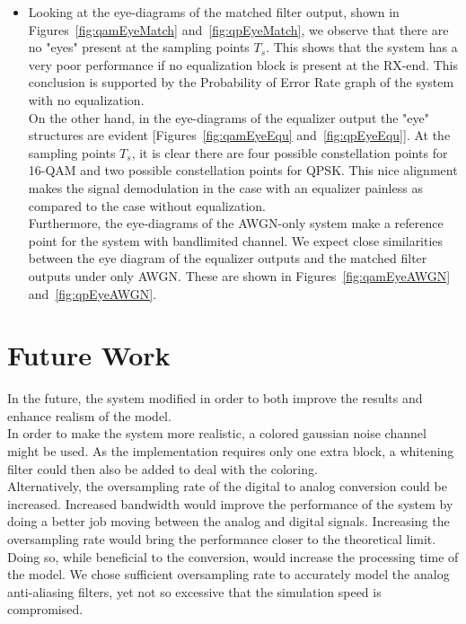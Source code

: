 \documentclass[]{article}
\begin{document}
\begin{itemize}
\item Looking at the eye-diagrams of the matched filter output, shown in Figures~\ref{fig:qamEyeMatch} and~\ref{fig:qpEyeMatch}, we observe that there are no "eyes" present at the sampling points $T_s$. This shows that the system has a very poor performance if no equalization block is present at the RX-end. This conclusion is supported by the Probability of Error Rate graph of the system with no equalization. \\

On the other hand, in the eye-diagrams of the equalizer output the "eye" structures are evident [Figures~\ref{fig:qamEyeEqu} and~\ref{fig:qpEyeEqu}].  At the sampling points $T_s$, it is clear there are four possible constellation points for 16-QAM and two possible constellation points for QPSK.  This nice alignment makes the signal demodulation in the case with an equalizer painless as compared to the case without equalization.  \\

Furthermore, the eye-diagrams of the AWGN-only system make a reference point for the system with bandlimited channel.  We expect close similarities between the eye diagram of the equalizer outputs and the matched filter outputs under only AWGN.  These are shown in Figures~\ref{fig:qamEyeAWGN} and~\ref{fig:qpEyeAWGN}. 
\end{itemize}



\section{Future Work}
\label{sec:future}
In the future, the system modified in order to both improve the results and enhance realism of the model. \\

In order to make the system more realistic, a colored gaussian noise channel might be used. As the implementation requires only one extra block, a whitening filter could then also be added to deal with the coloring. \\

Alternatively, the oversampling rate of the digital to analog conversion could be increased.  Increased bandwidth would improve the performance of the system by doing a better job moving between the analog and digital signals.   Increasing the oversampling rate would bring the performance closer to the theoretical limit.  Doing so, while beneficial to the conversion, would increase the processing time of the model.  We chose sufficient oversampling rate to accurately model the analog anti-aliasing filters, yet not so excessive that the simulation speed is compromised. \\
\end{document}
